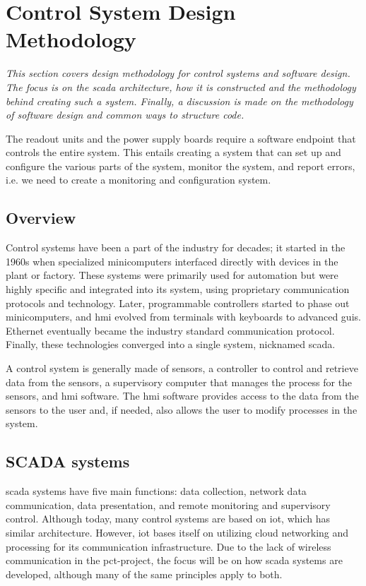 \documentclass[main.tex]{subfiles}
\begin{document}
\section{Control System Design Methodology}
\textit{This section covers design methodology for control systems and software design. The focus is on the \gls{scada} architecture, how it is constructed and the methodology behind creating such a system. Finally, a discussion is made on the methodology of software design and common ways to structure code.}

The readout units and the power supply boards require a software endpoint that controls the entire system. This entails creating a system that can set up and configure the various parts of the system, monitor the system, and report errors, i.e. we need to create a monitoring and configuration system.

\subsection{Overview}
Control systems have been a part of the industry for decades; it started in the 1960s when specialized minicomputers interfaced directly with devices in the plant or factory\cite{scada_history}. These systems were primarily used for automation but were highly specific and integrated into its system, using proprietary communication protocols and technology. Later, programmable controllers started to phase out minicomputers, and \gls{hmi} evolved from terminals with keyboards to advanced \gls{gui}s. Ethernet eventually became the industry standard communication protocol. Finally, these technologies converged into a single system, nicknamed \gls{scada}.

A control system is generally made of sensors, a controller to control and retrieve data from the sensors, a supervisory computer that manages the process for the sensors, and \gls{hmi} software. The \gls{hmi} software provides access to the data from the sensors to the user and, if needed, also allows the user to modify processes in the system.


\subsection{SCADA systems}
 \gls{scada} systems have five main functions: data collection, network data communication, data presentation, and remote monitoring and supervisory control\cite{scada_intro}. Although today, many control systems are based on \gls{iot}, which has similar architecture. However, \gls{iot} bases itself on utilizing cloud networking and processing for its communication infrastructure. Due to the lack of wireless communication in the \gls{pct}-project, the focus will be on how \gls{scada} systems are developed, although many of the same principles apply to both.
\end{document}

